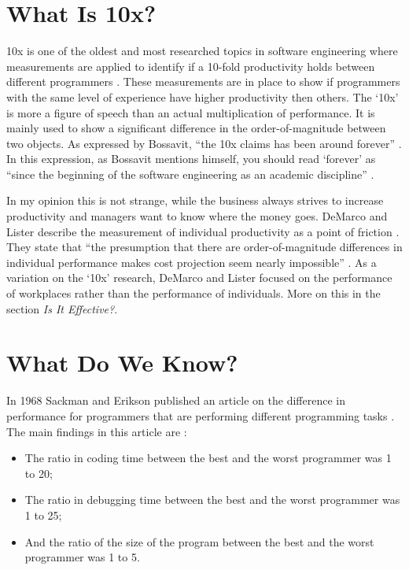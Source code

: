 \section*{What Is 10x?}

10x is one of the oldest and most researched topics in software engineering where measurements are applied to identify if a 10-fold productivity holds between different programmers \autocite[567]{MAKING_SOFTWARE}.
These measurements are in place to show if programmers with the same level of experience have higher productivity then others.
The `10x' is more a figure of speech than an actual multiplication of performance.
It is mainly used to show a significant difference in the order-of-magnitude between two objects.
As expressed by Bossavit, ``the 10x claims has been around forever'' \autocite[37]{bossavit2013leprechauns}.
In this expression, as Bossavit mentions himself, you should read `forever' as ``since the beginning of the software engineering as an academic discipline'' \autocite[38-39]{bossavit2013leprechauns}.

In my opinion this is not strange, while the business always strives to increase productivity and managers want to know where the money goes.
DeMarco and Lister describe the measurement of individual productivity as a point of friction \autocite[268]{demarco1985programmer}.
They state that ``the presumption that there are order-of-magnitude differences in individual performance makes cost projection seem nearly impossible'' \autocite[268]{demarco1985programmer}.
As a variation on the `10x' research, DeMarco and Lister focused on the performance of workplaces rather than the performance of individuals.
More on this in the section \textit{Is It Effective?}.

\section*{What Do We Know?}

In 1968 Sackman and Erikson published an article on the difference in performance for programmers that are performing different programming tasks \autocite{sackman1968exploratory}.
The main findings in this article are \autocite{sackman1968exploratory}\autocite[567]{MAKING_SOFTWARE}:
\begin{itemize}[noitemsep]
\item The ratio in coding time between the best and the worst programmer was 1 to 20;
\item The ratio in debugging time between the best and the worst programmer was 1 to 25;
\item And the ratio of the size of the program between the best and the worst programmer was 1 to 5.
\end{itemize}

